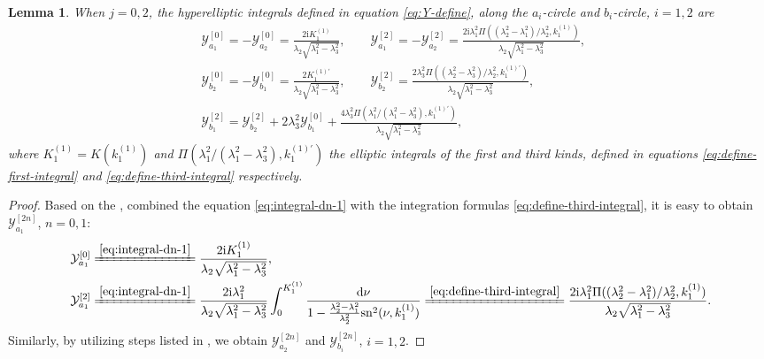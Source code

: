 \documentclass[11pt,reqno]{amsart}
\newcommand{\ii}{\mathrm{i}}
\newcommand{\sn}{\mathrm{sn}}
\newcommand{\dd}{\mathrm{d}}
\newtheorem{lemma}{Lemma}
\numberwithin{equation}{section}
\begin{document}
\begin{lemma}\label{lemma:dn-1-int}
	When $j=0,2$, the hyperelliptic integrals defined in equation \eqref{eq:Y-define}, along the $a_i$-circle and $b_i$-circle, $i=1,2$ are
	\begin{equation}\label{eq:Y-dn-1}\nonumber
		\begin{split}
			&\mathcal{Y}_{a_1}^{[0]}=-\mathcal{Y}_{a_2}^{[0]}=\frac{2\ii   K^{(1)}_1}{\lambda_2\sqrt{\lambda_1^2-\lambda_3^2}}, \qquad
			\mathcal{Y}_{a_1}^{[2]}=-\mathcal{Y}_{a_2}^{[2]}=\frac{2\ii\lambda_1^2 \Pi((\lambda_2^2-\lambda_1^2)/\lambda_2^2,  k^{(1)}_1)}{\lambda_2\sqrt{\lambda_1^2-\lambda_3^2}},\\
			&\mathcal{Y}_{b_2}^{[0]}=-\mathcal{Y}_{b_1}^{[0]}=\frac{2   K^{(1)\prime}_1}{\lambda_2\sqrt{\lambda_1^2-\lambda_3^2}},
			\qquad
			\mathcal{Y}_{b_2}^{[2]} =\frac{2  \lambda_3^2\Pi((\lambda_2^2-\lambda_3^2)/\lambda_2^2,  k^{(1)\prime}_1)}{\lambda_2\sqrt{\lambda_1^2-\lambda_3^2}}, \\
			&
			\mathcal{Y}_{b_1}^{[2]} =\mathcal{Y}_{b_2}^{[2]}+2\lambda_3^2\mathcal{Y}_{b_1}^{[0]}+\frac{4 \lambda_3^2\Pi(\lambda_1^2/(\lambda_1^2-\lambda_3^2),  k^{(1)\prime}_1)}{\lambda_2\sqrt{\lambda_1^2-\lambda_3^2}},
		\end{split}
	\end{equation}
	where $K_1^{(1)}=K(k_1^{(1)})$ and $\Pi(\lambda_1^2/(\lambda_1^2-\lambda_3^2),  k^{(1)\prime}_1)$ the elliptic integrals of the first and third kinds, defined in equations \eqref{eq:define-first-integral} and \eqref{eq:define-third-integral} respectively.
\end{lemma}


\begin{proof}
	Based on the , combined the equation \eqref{eq:integral-dn-1} with the integration formulas \eqref{eq:define-third-integral}, it is easy to obtain 
	$\mathcal{Y}_{a_1}^{[2n]}$, $n=0,1$:
	\begin{equation}\nonumber
		\begin{split}
			&\ \mathcal{Y}_{a_1}^{[0]}\xlongequal{\eqref{eq:integral-dn-1}}\frac{2\ii   K^{(1)}_1}{\lambda_2\sqrt{\lambda_1^2-\lambda_3^2}}, \\ 
			&\ 
			\mathcal{Y}_{a_1}^{[2]}\xlongequal{\eqref{eq:integral-dn-1}}\frac{2\ii \lambda_1^2}{\lambda_2\sqrt{\lambda_1^2-\lambda_3^2}}\int_{0}^{   K^{(1)}_1}\frac{\dd \nu}{1-\frac{\lambda_2^2-\lambda_1^2}{\lambda_2^2}\sn^2(\nu,  k^{(1)}_1)} \xlongequal{\eqref{eq:define-third-integral}}\frac{2\ii\lambda_1^2 \Pi((\lambda_2^2-\lambda_1^2)/\lambda_2^2,  k^{(1)}_1)}{\lambda_2\sqrt{\lambda_1^2-\lambda_3^2}}.
		\end{split}
	\end{equation}
	 Similarly, by utilizing steps listed in , we obtain $\mathcal{Y}_{a_2}^{[2n]}$ and $\mathcal{Y}_{b_i}^{[2n]}$, $i=1,2$.
\end{proof}
\end{document}
